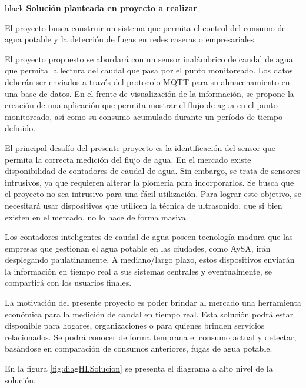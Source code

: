 \documentclass[
11pt, %
codirector, %
]{charter}
\begin{document}
\begin{consigna}{black}
\textbf{Solución planteada en proyecto a realizar} 

El proyecto busca construir un sistema que permita el control del consumo de agua potable y la detección de fugas en redes caseras o empresariales. 

El proyecto propuesto se abordará con un sensor inalámbrico de caudal de agua que permita la lectura del caudal que pasa por el punto monitoreado. Los datos deberán ser enviados a través del protocolo MQTT para su almacenamiento en una base de datos. En el frente de visualización de la información, se propone la creación de una aplicación que permita mostrar el flujo de agua en el punto monitoreado, así como su consumo acumulado durante un período de tiempo definido. 

El principal desafío del presente proyecto es la identificación del sensor que permita la correcta medición del flujo de agua. En el mercado existe disponibilidad de contadores de caudal de agua. Sin embargo, se trata de sensores intrusivos, ya que requieren alterar la plomería para incorporarlos. Se busca que el proyecto no sea intrusivo para una fácil utilización. Para lograr este objetivo, se necesitará usar dispositivos que utilicen la técnica de ultrasonido, que si bien existen en el mercado, no lo hace de forma masiva.

Los contadores inteligentes de caudal de agua poseen tecnología madura que las empresas que gestionan el agua potable en las ciudades, como AySA, irán desplegando paulatinamente. A mediano/largo plazo, estos dispositivos enviarán la información en tiempo real a sus sistemas centrales y eventualmente, se compartirá con los usuarios finales.

La motivación del presente proyecto es poder brindar al mercado una herramienta económica para la medición de caudal en tiempo real. Esta solución podrá estar disponible para hogares, organizaciones o para quienes brinden servicios relacionados. Se podrá conocer de forma temprana el consumo actual y detectar, basándose en comparación de consumos anteriores, fugas de agua potable.

En la figura \ref{fig:diagHLSolucion} se presenta el diagrama a alto nivel de la solución.




\end{consigna}
\end{document}
